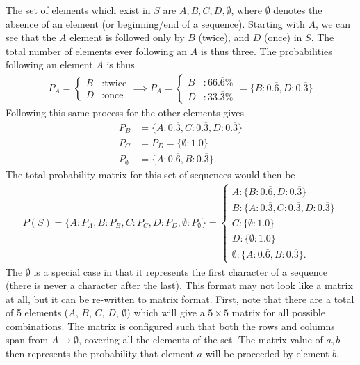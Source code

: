 The set of elements which exist in $S$ are ${A, B, C, D, \emptyset}$, where $\emptyset$ denotes the absence of an element (or beginning/end of a sequence). Starting with $A$, we can see that the $A$ element is followed only by $B$ (twice), and $D$ (once) in $S$. The total number of elements ever following an $A$ is thus three. The probabilities following an element $A$ is thus
\begin{align}
P_A = \begin{cases}
  B & :\text{twice} \\
  D & :\text{once}
\end{cases} \implies P_A = \begin{cases}
  B & : 66.\overline{6}\% \\
  D & : 33.\overline{3}\%
\end{cases} = \{B:0.\overline{6}, D:0.\overline{3}\}
\end{align}
Following this same process for the other elements gives
\begin{align}
P_B &= \{A:0.\overline{3}, C:0.\overline{3}, D:0.\overline{3}\} \\ P_C &= P_D = \{\emptyset:1.0\}\\ P_\emptyset &= \{A:0.\overline{6}, B:0.\overline{3}\}.
\end{align}
The total probability matrix for this set of sequences would then be
\begin{align}
P(S) = \{A:P_A, B:P_B, C:P_C, D:P_D, \emptyset: P_\emptyset\} = \begin{cases}
A:\{B:0.\overline{6}, D:0.\overline{3}\} \\
B: \{A:0.\overline{3}, C:0.\overline{3}, D:0.\overline{3}\} \\
C: \{\emptyset:1.0\} \\
D: \{\emptyset:1.0\} \\
\emptyset: \{A:0.\overline{6}, B:0.\overline{3}\}.
\end{cases}
\end{align}
The $\emptyset$ is a special case in that it represents the first character of a sequence (there is never a character after the last). This format may not look like a matrix at all, but it can be re-written to matrix format. First, note that there are a total of 5 elements ($A$, $B$, $C$, $D$, $\emptyset$) which will give a $5 \times 5$ matrix for all possible combinations. The matrix is configured such that both the rows and columns span from $A\rightarrow\emptyset$, covering all the elements of the set. The matrix value of $a, b$ then represents the probability that element $a$ will be proceeded by element $b$.

